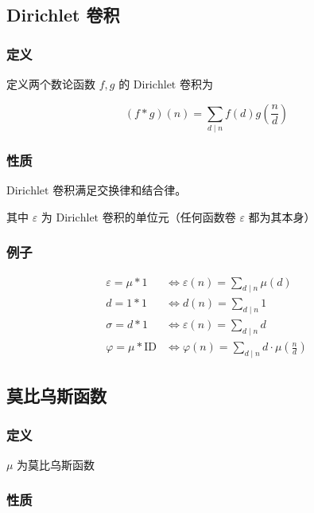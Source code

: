 \hr

\subsection{Dirichlet 卷积}

\subsubsection{定义}

定义两个数论函数 $f,g$ 的 $\text{Dirichlet}$ 卷积为

$$
(f*g)(n)=\sum_{d\mid n}f(d)g(\frac{n}{d})
$$

\subsubsection{性质}

$\text{Dirichlet}$ 卷积满足交换律和结合律。

其中 $\varepsilon$ 为 $\text{Dirichlet}$ 卷积的单位元（任何函数卷 $\varepsilon$ 都为其本身）

\subsubsection{例子}

$$
\begin{align*}
\varepsilon=\mu*1&\Leftrightarrow\varepsilon(n)=\sum_{d\mid n}\mu(d)\\
d=1*1&\Leftrightarrow d(n)=\sum_{d\mid n}1\\
\sigma=d*1&\Leftrightarrow\varepsilon(n)=\sum_{d\mid n}d\\
\varphi=\mu*\text{ID}&\Leftrightarrow\varphi(n)=\sum_{d\mid n}d\cdot\mu(\frac{n}{d})
\end{align*}
$$

\hr

\subsection{莫比乌斯函数}

\subsubsection{定义}

$\mu$ 为莫比乌斯函数

\subsubsection{性质}

